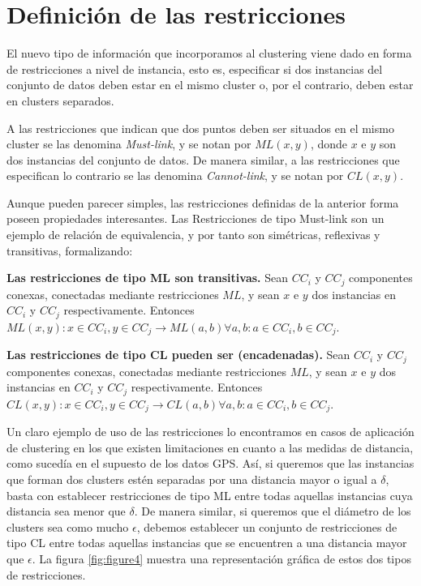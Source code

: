 \section{Definición de las restricciones}

El nuevo tipo de  información que incorporamos al clustering viene dado en forma de restricciones a nivel de instancia, esto es, especificar si dos instancias del conjunto de datos deben estar en el mismo cluster o, por el contrario, deben estar en clusters separados.

A las restricciones que indican que dos puntos deben ser situados en el mismo cluster se las denomina \textit{Must-link}, y se notan por $ML(x,y)$, donde $x$ e $y$ son dos instancias del conjunto de datos. De manera similar, a las restricciones que especifican lo contrario se las denomina \textit{Cannot-link}, y se notan por $CL(x,y)$. \cite{WagstaffCardie:2000}

Aunque pueden parecer simples, las restricciones definidas de la anterior forma poseen propiedades interesantes. Las Restricciones de tipo Must-link son un ejemplo de relación de equivalencia, y por tanto son simétricas, reflexivas y transitivas, formalizando:

\begin{observacion}
	\textbf{Las restricciones de tipo ML son transitivas.} Sean $CC_i$ y $CC_j$ componentes conexas, conectadas mediante restricciones $ML$, y sean $x$ e $y$ dos instancias en $CC_i$ y $CC_j$ respectivamente. Entonces $ML(x,y): x \in CC_i, y \in CC_j \rightarrow ML(a,b) \forall a,b: a\in CC_i, b \in CC_j$. \cite{Survey:2007}
\end{observacion}

\begin{observacion}
	\textbf{Las restricciones de tipo CL pueden ser (encadenadas).} Sean $CC_i$ y $CC_j$ componentes conexas, conectadas mediante restricciones $ML$, y sean $x$ e $y$ dos instancias en $CC_i$ y $CC_j$ respectivamente. Entonces $CL(x,y): x \in CC_i, y \in CC_j \rightarrow CL(a,b) \forall a,b: a\in CC_i, b \in CC_j$. \cite{Survey:2007}
\end{observacion}

Un claro ejemplo de uso de las restricciones lo encontramos en casos de aplicación de clustering en los que existen limitaciones en cuanto a las medidas de distancia, como sucedía en el supuesto de los datos GPS. Así, si queremos que las instancias que forman dos clusters estén separadas por una distancia mayor o igual a $\delta$, basta con establecer restricciones de tipo ML entre todas aquellas instancias cuya distancia sea menor que $\delta$. 
De manera similar, si queremos que el diámetro de los clusters sea como mucho $\epsilon$, debemos establecer un conjunto de restricciones de tipo CL entre todas aquellas instancias que se encuentren a una distancia mayor que $\epsilon$. La figura \ref{fig:figure4} muestra una representación gráfica de estos dos tipos de restricciones.

